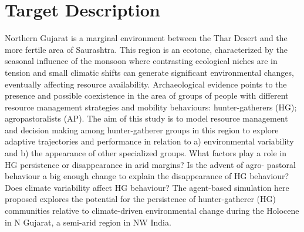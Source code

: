 \documentclass[11pt,oneside,a4paper,openright]{report}
\begin{document}
	

\section{Target Description}





Northern Gujarat is a marginal environment between the Thar Desert and the more fertile area of
Saurashtra. This region is an ecotone, characterized by the seasonal influence of the monsoon where
contrasting ecological niches are in tension and small climatic shifts can generate significant
environmental changes, eventually affecting resource availability. Archaeological evidence points to
the presence and possible coexistence in the area of groups of people with different resource
management strategies and mobility behaviours: hunter-gatherers (HG); agropastoralists (AP).
The aim of this study is to model resource management and decision making among hunter-gatherer
groups in this region to explore adaptive trajectories and performance in relation to a) environmental
variability and b) the appearance of other specialized groups.
What factors play a role in HG persistence or disappearance in arid margins? Is the advent of agro-
pastoral behaviour a big enough change to explain the disappearance of HG behaviour? Does climate
variability affect HG behaviour?
The agent-based simulation here proposed explores the potential for the persistence of hunter-gatherer
(HG) communities relative to climate-driven environmental change during the Holocene in N Gujarat, a
semi-arid region in NW India.
\end{document}
